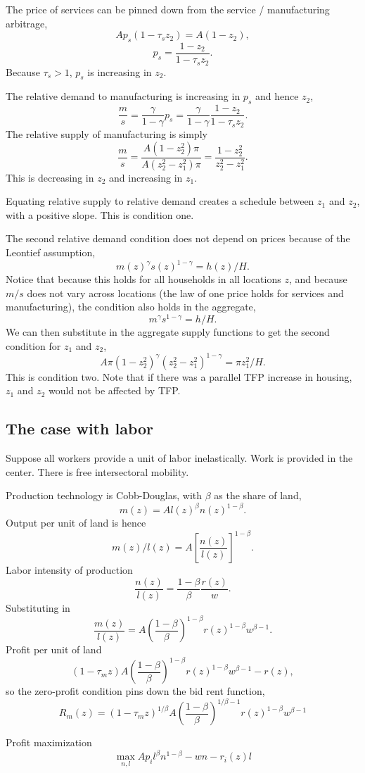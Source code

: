 \documentclass[letter]{amsart}
\theoremstyle{definition}
\theoremstyle{remark}
\numberwithin{equation}{section}
\begin{document}
The price of services can be pinned down from the service / manufacturing arbitrage,
\[
Ap_s(1-\tau_s z_2) = A(1-z_2),
\]
\[
p_s = \frac{1-z_2}{1-\tau_s z_2}.
\]
Because $\tau_s>1$, $p_s$ is increasing in $z_2$.

The relative demand to manufacturing is increasing in $p_s$ and hence $z_2$,
\[
\frac{m}{s} = \frac{\gamma}{1-\gamma}p_s = \frac{\gamma}{1-\gamma}\frac{1-z_2}{1-\tau_s z_2}.
\]
The relative supply of manufacturing is simply
\[
\frac{m}{s} = \frac{A(1-z_2^2)\pi}{A(z_2^2-z_1^2)\pi} = \frac{1-z_2^2}{z_2^2-z_1^2}.
\]
This is decreasing in $z_2$ and increasing in $z_1$.

Equating relative supply to relative demand creates a schedule between $z_1$ and $z_2$, with a positive slope. This is condition one.

The second relative demand condition does not depend on prices because of the Leontief assumption,
\[
m(z)^\gamma s(z)^{1-\gamma} = h(z)/H.
\]
Notice that because this holds for all households in all locations $z$, and because $m/s$ does not vary across locations (the law of one price holds for services and manufacturing), the condition also holds in the aggregate,
\[
m^\gamma s^{1-\gamma} = h/H.
\]
We can then substitute in the aggregate supply functions to get the second condition for $z_1$ and $z_2$,
\[
A\pi (1-z_2^2)^\gamma(z_2^2-z_1^2)^{1-\gamma} = \pi z_1^2/H.
\]
This is condition two. Note that if there was a parallel TFP increase in housing, $z_1$ and $z_2$ would not be affected by TFP.

\subsection{The case with labor}
Suppose all workers provide a unit of labor inelastically. Work is provided in the center. There is free intersectoral mobility.

Production technology is Cobb-Douglas, with $\beta$ as the share of land,
\[
m(z) = A l(z)^\beta n(z)^{1-\beta}.
\]
Output per unit of land is hence
\[
m(z)/l(z) = A \left[\frac{n(z)}{l(z)}\right]^{1-\beta}.
\]
Labor intensity of production
\[
\frac{n(z)}{l(z)} = \frac{1-\beta}{\beta}\frac{r(z)}{w}.
\]
Substituting in
\[
\frac{m(z)}{l(z)} = A \left(\frac{1-\beta}{\beta}\right)^{1-\beta}r(z)^{1-\beta}w^{\beta-1}.
\]
Profit per unit of land
\[
(1-\tau_m z)A \left(\frac{1-\beta}{\beta}\right)^{1-\beta}r(z)^{1-\beta}w^{\beta-1} - r(z),
\]
so the zero-profit condition pins down the bid rent function,
\[
R_m(z) = (1-\tau_m z)^{1/\beta}A \left(\frac{1-\beta}{\beta}\right)^{1/\beta-1}r(z)^{1-\beta}w^{\beta-1}
\]


Profit maximization
\[
\max_{n,l} A p_i l^\beta n^{1-\beta} - wn - r_i(z)l
\]
\end{document}
